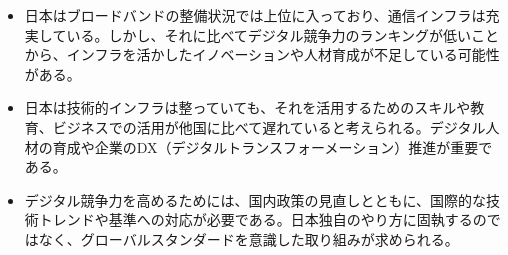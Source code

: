 \documentclass[a4paper,11pt,dvipdfmx]{ujarticle}
\begin{document}
\begin{itemize}
    \item 日本はブロードバンドの整備状況では上位に入っており、通信インフラは充実している。しかし、それに比べてデジタル競争力のランキングが低いことから、インフラを活かしたイノベーションや人材育成が不足している可能性がある。
    \item 日本は技術的インフラは整っていても、それを活用するためのスキルや教育、ビジネスでの活用が他国に比べて遅れていると考えられる。デジタル人材の育成や企業のDX（デジタルトランスフォーメーション）推進が重要である。
    \item デジタル競争力を高めるためには、国内政策の見直しとともに、国際的な技術トレンドや基準への対応が必要である。日本独自のやり方に固執するのではなく、グローバルスタンダードを意識した取り組みが求められる。
\end{itemize}
%


%


\end{document}
